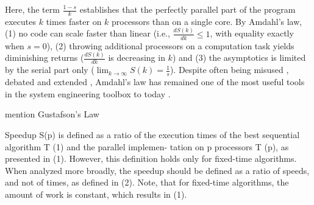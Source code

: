 Here, the term $\frac{1-s}{k}$ establishes that the perfectly parallel part of the program executes $k$ times faster on $k$ processors than on a single core. By Amdahl's law, (1) no code can scale faster than linear (i.e., $\frac{d S(k)}{d k} \le 1$, with equality exactly when $s=0$), (2) throwing additional processors on a computation task yields diminishing returns ($\frac{d S(k)}{d k}$ is decreasing in $k$) and (3) the asymptotics is limited by the serial part only ($\lim_{k\to \infty}S(k) = \frac1{s}$). Despite often being misused \cite{10.5555/775339.775386}, debated \cite{10.1145/42411.42415} and extended \cite{4563876, 6280307,1580395,406581,6163449}, Amdahl's law has remained one of the most useful tools in the system engineering toolbox to today \cite{10.5555/1951599}. %


mention  Gustafson's Law %


Speedup S(p) is defined as a ratio of the execution times of
the best sequential algorithm T (1) and the parallel implemen-
tation on p processors T (p), as presented in (1). However, this
definition holds only for fixed-time algorithms. When analyzed
more broadly, the speedup should be defined as a ratio of
speeds, and not of times, as defined in (2). Note, that for
fixed-time algorithms, the amount of work is constant, which
results in (1).





